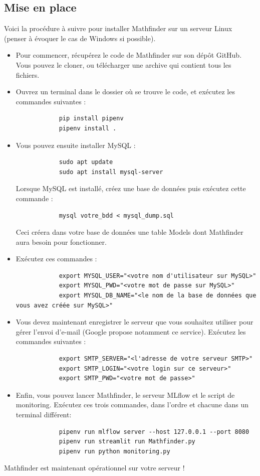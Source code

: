 \documentclass[french]{article}
\begin{document}
    \subsection{Mise en place}
    Voici la procédure à suivre pour installer Mathfinder sur un serveur Linux (penser à évoquer le cas de Windows si possible).
    \begin{itemize}
        \item Pour commencer, récupérez le code de Mathfinder sur son dépôt GitHub. Vous pouvez le cloner, ou télécharger une archive qui contient tous les fichiers.
        \item Ouvrez un terminal dans le dossier où se trouve le code, et exécutez les commandes suivantes :
        \begin{verbatim}
            pip install pipenv
            pipenv install .
        \end{verbatim}
        \item Vous pouvez ensuite installer MySQL :
        \begin{verbatim}
            sudo apt update
            sudo apt install mysql-server
        \end{verbatim}
        Lorsque MySQL est installé, créez une base de données puis exécutez cette commande :
        \begin{verbatim}
            mysql votre_bdd < mysql_dump.sql
        \end{verbatim}
        Ceci créera dans votre base de données une table Models dont Mathfinder aura besoin pour fonctionner.
        \item Exécutez ces commandes :
        \begin{verbatim}
            export MYSQL_USER="<votre nom d'utilisateur sur MySQL>"
            export MYSQL_PWD="<votre mot de passe sur MySQL>"
            export MYSQL_DB_NAME="<le nom de la base de données que vous avez créée sur MySQL>"
        \end{verbatim}
        \item Vous devez maintenant enregistrer le serveur que vous souhaitez utiliser pour gérer l'envoi d'e-mail (Google propose notamment ce service). Exécutez les commandes suivantes :
        \begin{verbatim}
            export SMTP_SERVER="<l'adresse de votre serveur SMTP>"
            export SMTP_LOGIN="<votre login sur ce serveur>"
            export SMTP_PWD="<votre mot de passe>"
        \end{verbatim}
        \item Enfin, vous pouvez lancer Mathfinder, le serveur MLflow et le script de monitoring. Exécutez ces trois commandes, dans l'ordre et chacune dans un terminal différent:
        \begin{verbatim}
            pipenv run mlflow server --host 127.0.0.1 --port 8080
            pipenv run streamlit run Mathfinder.py
            pipenv run python monitoring.py
        \end{verbatim} 
    \end{itemize}
    Mathfinder est maintenant opérationnel sur votre serveur !
\end{document}
